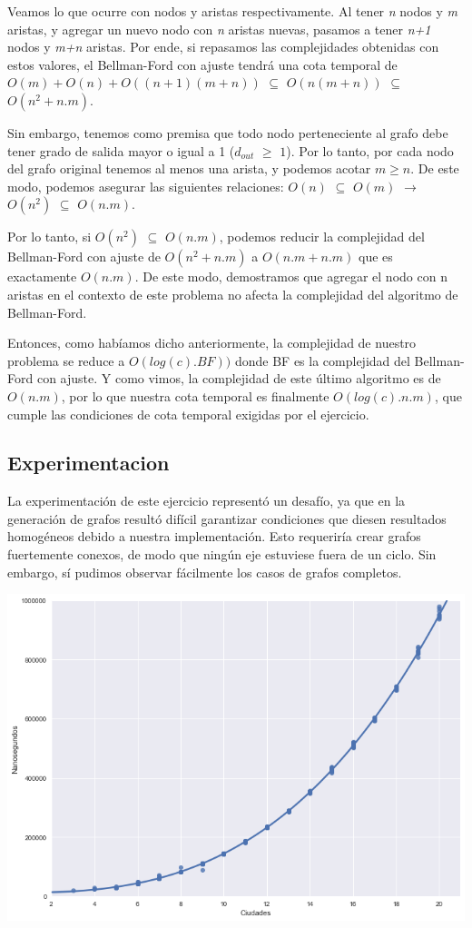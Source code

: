 Veamos lo que ocurre con nodos y aristas respectivamente. Al tener \textit{n} nodos y \textit{m} aristas, y agregar un nuevo nodo con \textit{n} aristas nuevas, pasamos a tener \textit{n+1} nodos y \textit{m+n} aristas. Por ende, si repasamos las complejidades obtenidas con estos valores, el Bellman-Ford con ajuste tendrá una cota temporal de $O(m) + O(n) + O((n+1)(m+n))$ $\subseteq$ $O(n(m+n))$ $\subseteq$ $O(n^2 + n.m)$.

Sin embargo, tenemos como premisa que todo nodo perteneciente al grafo debe tener grado de salida mayor o igual a 1 ($d_{out}$ $\geq$ $1$). Por lo tanto, por cada nodo del grafo original tenemos al menos una arista, y podemos acotar $m \geq n$. De este modo, podemos asegurar las siguientes relaciones: $O(n)$ $\subseteq$ $O(m)$ $\rightarrow$ $O(n^2)$ $\subseteq$ $O(n.m)$.

Por lo tanto, si $O(n^2)$ $\subseteq$ $O(n.m)$, podemos reducir la complejidad del Bellman-Ford con ajuste de $O(n^2 + n.m)$ a $O(n.m + n.m)$ que es exactamente $O(n.m)$. De este modo, demostramos que agregar el nodo con n aristas en el contexto de este problema no afecta la complejidad del algoritmo de Bellman-Ford.

Entonces, como habíamos dicho anteriormente, la complejidad de nuestro problema se reduce a $O(log(c).BF))$ donde BF es la complejidad del Bellman-Ford con ajuste. Y como vimos, la complejidad de este último algoritmo es de $O(n.m)$, por lo que nuestra cota temporal es finalmente $O(log(c).n.m)$, que cumple las condiciones de cota temporal exigidas por el ejercicio.

\subsection{Experimentacion}

La experimentación de este ejercicio representó un desafío, ya que en la generación de grafos resultó difícil garantizar condiciones que diesen resultados homogéneos debido a nuestra implementación. Esto requeriría crear grafos fuertemente conexos, de modo que ningún eje estuviese fuera de un ciclo. Sin embargo, sí pudimos observar fácilmente los casos de grafos completos.

\begin{center}
	\includegraphics[scale=0.5]{imagenes/ej2-1.png}
\end{center}

